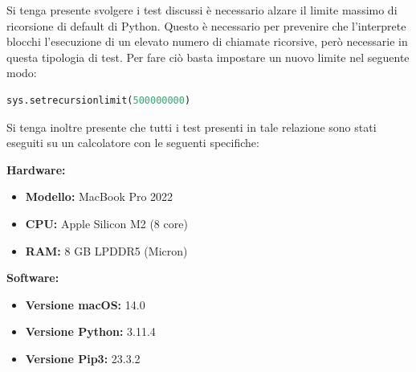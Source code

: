 \documentclass{article}
\begin{document}
Si tenga presente svolgere i test discussi è necessario alzare il limite massimo di ricorsione di default di Python. Questo è necessario per prevenire che l'interprete blocchi l'esecuzione di un elevato numero di chiamate ricorsive, però necessarie in questa tipologia di test.
Per fare ciò basta impostare un nuovo limite nel seguente modo:
\begin{lstlisting}[language=Python]
sys.setrecursionlimit(500000000)
\end{lstlisting}


\vspace{20pt}


Si tenga inoltre presente che tutti i test presenti in tale relazione sono stati eseguiti su un calcolatore con le seguenti specifiche:

\begin{multicols}{2}
    \textbf{Hardware:}
    \begin{itemize}
        \item \textbf{Modello:} MacBook Pro 2022
        \item \textbf{CPU:} Apple Silicon M2 (8 core)
        \item \textbf{RAM:} 8 GB LPDDR5 (Micron)
    \end{itemize}
    
    \columnbreak
    
    \textbf{Software:}
    \begin{itemize}
        \item \textbf{Versione macOS:} 14.0
        \item \textbf{Versione Python:} 3.11.4
        \item \textbf{Versione Pip3:} 23.3.2
    \end{itemize}
\end{multicols}

\vspace{20pt}

\printbibliography[heading=bibintoc, title={Bibliografia}]  
\end{document}
